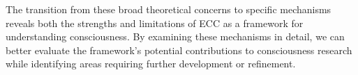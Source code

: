 The transition from these broad theoretical concerns to specific mechanisms reveals both the strengths and limitations of ECC as a framework for understanding consciousness. By examining these mechanisms in detail, we can better evaluate the framework's potential contributions to consciousness research while identifying areas requiring further development or refinement.




